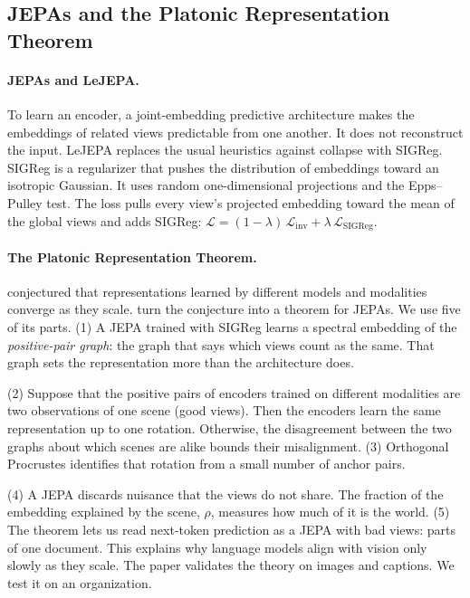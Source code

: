 \documentclass[11pt]{article}
\begin{document}
\subsection{JEPAs and the Platonic Representation Theorem}
\paragraph{JEPAs and LeJEPA.}
To learn an encoder, a joint-embedding predictive architecture makes the embeddings of related views predictable from one another. It does not reconstruct the input\citep{lecun2022path,assran2023ijepa}. LeJEPA\citep{balestriero2025lejepa} replaces the usual heuristics against collapse with SIGReg. SIGReg is a regularizer that pushes the distribution of embeddings toward an isotropic Gaussian. It uses random one-dimensional projections and the Epps--Pulley test. The loss pulls every view's projected embedding toward the mean of the global views and adds SIGReg: $\mathcal{L} = (1-\lambda)\,\mathcal{L}_{\text{inv}} + \lambda\,\mathcal{L}_{\text{SIGReg}}$.

\paragraph{The Platonic Representation Theorem.}
\citet{huh2024platonic} conjectured that representations learned by different models and modalities converge as they scale. \citet{balestriero2026platonic} turn the conjecture into a theorem for JEPAs. We use five of its parts. (1) A JEPA trained with SIGReg learns a spectral embedding of the \emph{positive-pair graph}: the graph that says which views count as the same. That graph sets the representation more than the architecture does.

(2) Suppose that the positive pairs of encoders trained on different modalities are two observations of one scene (good views). Then the encoders learn the same representation up to one rotation. Otherwise, the disagreement between the two graphs about which scenes are alike bounds their misalignment. (3) Orthogonal Procrustes\citep{schonemann1966procrustes} identifies that rotation from a small number of anchor pairs.

(4) A JEPA discards nuisance that the views do not share. The fraction of the embedding explained by the scene, $\rho$, measures how much of it is the world. (5) The theorem lets us read next-token prediction as a JEPA with bad views: parts of one document. This explains why language models align with vision only slowly as they scale. The paper validates the theory on images and captions. We test it on an organization.
\end{document}
